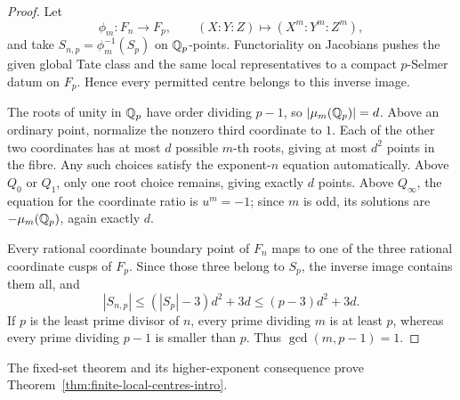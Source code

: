 \begin{proof}
Let
\[
 \phi_m:F_n\longrightarrow F_p,\qquad
 (X:Y:Z)\longmapsto(X^m:Y^m:Z^m),
\]
and take \(S_{n,p}=\phi_m^{-1}(S_p)\) on \(\mathbb Q_p\)-points.
Functoriality on Jacobians pushes the given global Tate class and
the same local representatives to a compact \(p\)-Selmer datum on
\(F_p\). Hence every permitted centre belongs to this inverse image.

The roots of unity in \(\mathbb Q_p\) have order dividing \(p-1\), so
\(|\mu_m(\mathbb Q_p)|=d\). Above an ordinary point, normalize the nonzero
third coordinate to \(1\). Each of the other two coordinates has
at most \(d\) possible \(m\)-th roots, giving at most \(d^2\) points
in the fibre. Any such choices satisfy the exponent-\(n\) equation
automatically. Above \(Q_0\) or \(Q_1\), only one root choice remains,
giving exactly \(d\) points. Above \(Q_\infty\), the equation for
the coordinate ratio is \(u^m=-1\); since \(m\) is odd, its solutions
are \(-\mu_m(\mathbb Q_p)\), again exactly \(d\).

Every rational coordinate boundary point of \(F_n\) maps to one of
the three rational coordinate cusps of \(F_p\). Since those three
belong to \(S_p\), the inverse image contains them all, and
\[
 |S_{n,p}|
 \leq(|S_p|-3)d^2+3d
 \leq(p-3)d^2+3d.
\]
If \(p\) is the least prime divisor of \(n\), every prime dividing
\(m\) is at least \(p\), whereas every prime dividing \(p-1\) is
smaller than \(p\). Thus \(\gcd(m,p-1)=1\).
\end{proof}


The fixed-set theorem and its higher-exponent consequence prove
Theorem~\ref{thm:finite-local-centres-intro}.
